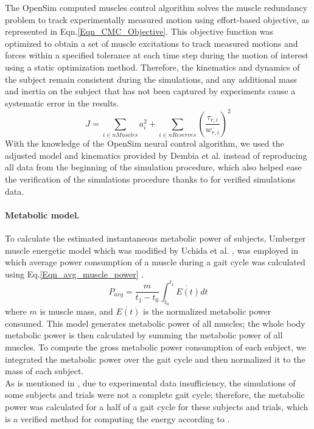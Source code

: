 \documentclass[10pt,letterpaper]{article}
\begin{document}
The OpenSim computed muscles control algorithm solves the muscle redundancy problem to track experimentally measured motion using effort-based objective, as represented in Eqn.\eqref{Eqn_CMC_Objective}. This objective function was optimized to obtain a set of muscle excitations to track measured motions and forces within a specified tolerance at each time step during the motion of interest using a static optimization method\cite{92}. Therefore, the kinematics and dynamics of the subject remain consistent during the simulations, and any additional mass and inertia on the subject that has not been captured by experiments cause a systematic error in the results.\\
\begin{equation}\label{Eqn_CMC_Objective}
J = \sum_{i\in nMuscles} a_{i}^{2} + \sum_{i \in nReserves} (\frac{\tau_{r,i}}{w_{r,i}})^2
\end{equation}
With the knowledge of the OpenSim neural control algorithm, we used the adjusted model and kinematics provided by Dembia et al.\cite{93} instead of reproducing all data from the beginning of the simulation procedure, which also helped ease the verification of the simulations procedure thanks to \cite{93} for verified simulations data.\\
\paragraph*{Metabolic model.} To calculate the estimated instantaneous metabolic power of subjects, Umberger \cite{105} muscle energetic model which was modified by Uchida et al. \cite{106}, was employed in which average power consumption of a muscle during a gait cycle was calculated using Eq.\eqref{Eqn_avg_muscle_power} \cite{106}.\\
\begin{equation}\label{Eqn_avg_muscle_power}
	P_{avg} = \frac{m}{t_1 - t_0}\int_{t_0}^{t_1} \dot{E(t)} dt
\end{equation}
where $m$ is muscle mass, and $\dot{E(t)}$ is the normalized metabolic power consumed. This model generates metabolic power of all muscles; the whole body metabolic power is then calculated by summing the metabolic power of all muscles\cite{106}. To compute the gross metabolic power consumption of each subject, we integrated the metabolic power over the gait cycle and then normalized it to the mass of each subject.\\
As is mentioned in \cite{93}, due to experimental data insufficiency, the simulations of some subjects and trials were not a complete gait cycle; therefore, the metabolic power was calculated for a half of a gait cycle for these subjects and trials, which is a verified method for computing the energy according to \cite{93}. \\
\end{document}
